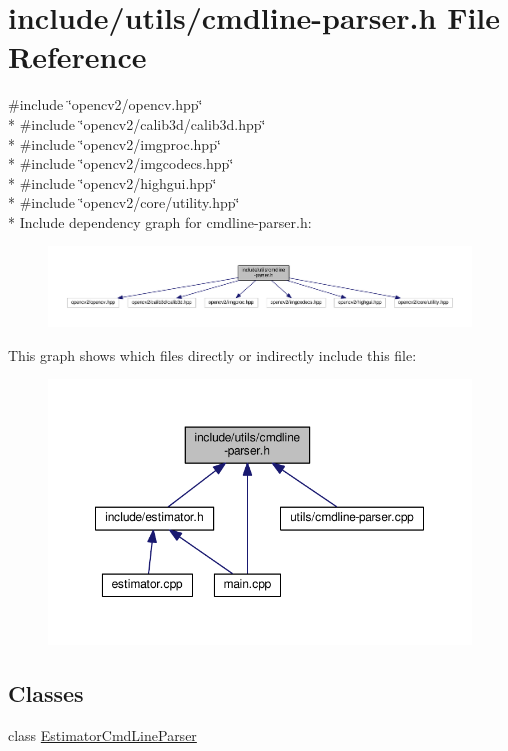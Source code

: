 \hypertarget{cmdline-parser_8h}{}\section{include/utils/cmdline-\/parser.h File Reference}
\label{cmdline-parser_8h}
{\ttfamily \#include \char`\"{}opencv2/opencv.\+hpp\char`\"{}}\\*
{\ttfamily \#include \char`\"{}opencv2/calib3d/calib3d.\+hpp\char`\"{}}\\*
{\ttfamily \#include \char`\"{}opencv2/imgproc.\+hpp\char`\"{}}\\*
{\ttfamily \#include \char`\"{}opencv2/imgcodecs.\+hpp\char`\"{}}\\*
{\ttfamily \#include \char`\"{}opencv2/highgui.\+hpp\char`\"{}}\\*
{\ttfamily \#include \char`\"{}opencv2/core/utility.\+hpp\char`\"{}}\\*
Include dependency graph for cmdline-\/parser.h\+:
\nopagebreak
\begin{figure}[H]
\begin{center}
\leavevmode
\includegraphics[width=350pt]{cmdline-parser_8h__incl}
\end{center}
\end{figure}
This graph shows which files directly or indirectly include this file\+:
\nopagebreak
\begin{figure}[H]
\begin{center}
\leavevmode
\includegraphics[width=350pt]{cmdline-parser_8h__dep__incl}
\end{center}
\end{figure}
\subsection*{Classes}
\begin{DoxyCompactItemize}
\item 
class \hyperlink{classEstimatorCmdLineParser}{Estimator\+Cmd\+Line\+Parser}
\end{DoxyCompactItemize}

